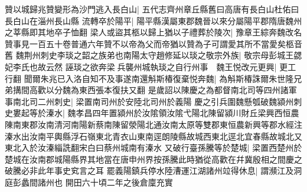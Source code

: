 贊以城歸兆贊變形為沙門逃入長白山|{
	五代志齊州章丘縣舊曰高唐有長白山杜佑曰長白山在淄州長山縣}
流轉卒於陽平|{
	陽平縣漢屬東郡魏晉以來分屬陽平郡隋唐魏州之莘縣即其地卒子恤翻}
梁人或盜其柩以歸上猶以子禮葬於陵次|{
	豫章王綜奔魏改名贊事見一百五十卷普通六年贊不以帝為父而帝猶以贊為子可謂愛其所不當愛矣柩音舊}
魏荆州刺史李琰之韶之族弟也南陽太守趙修延以琰之敬宗外族|{
	敬宗母彭城王勰妃李氏也故云然}
誣琰之欲奔梁兵襲州城執琰之自行州事　魏王悦改元更興|{
	更工行翻}
聞爾朱兆已入洛自知不及事遂南還斛斯椿復棄悦奔魏|{
	為斛斯椿誅爾朱世隆兄弟搆間高歡以分魏為東西張本復扶又翻}
是歲詔以陳慶之為都督南北司等四州諸軍事南北司二州刺史|{
	梁置南司州於安陸北司州於義陽}
慶之引兵圍魏懸瓠破魏潁州刺史婁起等於溱水|{
	魏孝昌四年置潁州於汝隂領汝隂弋陽北陳留潁川財丘梁興西恒農陳南東郡汝南清河南陽新蔡南陳留滎陽北通汝南太原等雙郡東恒農新興等郡水經注溱水出汝南平輿縣浮石嶺東北青衣山東南逕朗陵縣故城西東北逕北宜春縣故城北又東北入於汝溱緇詵翻宋白曰蔡州城南有溱水}
又破行臺孫騰等於楚城|{
	梁置西楚州於楚城在汝南郡城陽縣界其地當在唐申州界按孫騰此時猶從高歡在幷冀殷相之間慶之破騰必非此年事史䆒言之耳}
罷義陽鎮兵停水陸漕運江湖諸州竝得休息|{
	謂瀕江及洞庭彭蠡間諸州也}
開田六十頃二年之後倉廩充實

